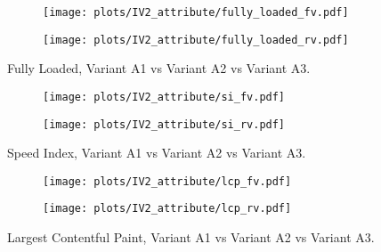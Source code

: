 \begin{figure}
	\centering
	\begin{subfigure}{.5\textwidth}
		\centering
		\texttt{[image: plots/IV2\_attribute/fully\_loaded\_fv.pdf]}
		\label{fig:sub1}
	\end{subfigure}%
	\begin{subfigure}{.5\textwidth}
		\centering
		\texttt{[image: plots/IV2\_attribute/fully\_loaded\_rv.pdf]}
		\label{fig:sub2}
	\end{subfigure}
	\caption{Fully Loaded, Variant A1 vs Variant A2 vs Variant A3.}
	\label{figure:plt_original_test}
\end{figure}


\begin{figure}
	\centering
	\begin{subfigure}{.5\textwidth}
		\centering
		\texttt{[image: plots/IV2\_attribute/si\_fv.pdf]}
		\label{fig:sub1}
	\end{subfigure}%
	\begin{subfigure}{.5\textwidth}
		\centering
		\texttt{[image: plots/IV2\_attribute/si\_rv.pdf]}
		\label{fig:sub2}
	\end{subfigure}
	\caption{Speed Index, Variant A1 vs Variant A2 vs Variant A3.}
	\label{figure:plt_original_test}
\end{figure}

\begin{figure}
	\centering
	\begin{subfigure}{.5\textwidth}
		\centering
		\texttt{[image: plots/IV2\_attribute/lcp\_fv.pdf]}
		\label{fig:sub1}
	\end{subfigure}%
	\begin{subfigure}{.5\textwidth}
		\centering
		\texttt{[image: plots/IV2\_attribute/lcp\_rv.pdf]}
		\label{fig:sub2}
	\end{subfigure}
	\caption{Largest Contentful Paint, Variant A1 vs Variant A2 vs Variant A3.}
	\label{figure:plt_original_test}
\end{figure}



\clearpage




